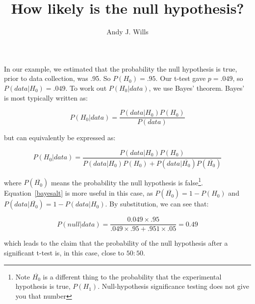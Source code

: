 \documentclass{article}
\title{How likely is the null hypothesis?}
\author{Andy J. Wills}
\begin{document}
\maketitle

In our example, we estimated that the probability the null hypothesis
is true, prior to data collection, was .95. So $P(H_0) = .95$. Our t-test gave
$p = .049$, so $P(data|H_0) = .049$. To work out $P(H_0|data)$, we use Bayes'
theorem. Bayes' is most typically written as:

\begin{equation}
  P(H_0 | data) = \frac{P(data | H_0) P(H_0)} {P(data)}
  \label{bayes}
\end{equation}

but can equivalently be expressed as:

\begin{equation}
 P(H_0 | data) = \frac{P(data | H_0) P(H_0)} {P(data | H_0) P(H_0) +
   P(data | \overline{H_0}) P(\overline{H_0})}
 \label{bayesalt}
\end{equation}

where $P(\overline{H_0})$ means the probability the null hypothesis is
false\footnote{Note $\overline{H_0}$ is a different thing to the probability
  that the experimental hypothesis is true, $P(H_1)$. Null-hypothesis
  significance testing does not give you that number}. Equation~\ref{bayesalt}
is more useful in this case, as $P(\overline{H_0}) = 1 - P(H_0)$ and
$P(data | \overline{H_0}) = 1 - P(data | H_0)$. By substitution, we can see that:

\begin{equation}
P(null | data) =
\frac{0.049 \times .95}
{.049 \times .95 + .951 \times .05} = 0.49
\label{bayeseg}
\end{equation}

which leads to the claim that the probability of the null hypothesis after a
significant t-test is, in this case, close to $50:50$.
\end{document}
